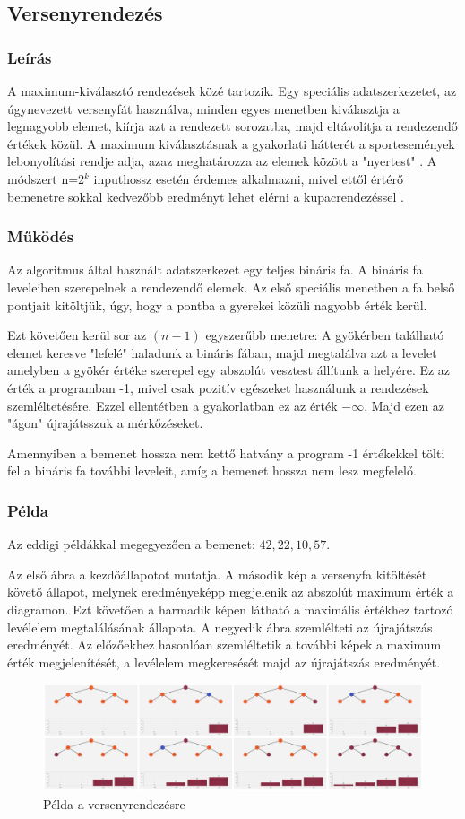 \documentclass{elteikthesis}
\newcommand{\hiddensubsubsection}[1]{
	\stepcounter{subsubsection}
	\subsubsection*{{#1}}	
}
\begin{document}
\subsection{Versenyrendezés}
\hiddensubsubsection{Leírás}
A maximum-kiválasztó rendezések közé tartozik. Egy speciális adatszerkezetet, az úgynevezett versenyfát használva, minden egyes menetben kiválasztja a legnagyobb elemet, kiírja azt a rendezett sorozatba, majd eltávolítja a rendezendő értékek közül. A maximum kiválasztásnak a gyakorlati hátterét a sportesemények lebonyolítási rendje adja, azaz meghatározza az elemek között a "nyertest" \cite{Fekete}. A módszert n=2$^k$ inputhossz esetén érdemes alkalmazni, mivel ettől értérő bemenetre sokkal kedvezőbb eredményt lehet elérni a kupacrendezéssel \cite{Fekete}. \par
\hiddensubsubsection{Működés}
Az algoritmus által használt adatszerkezet egy teljes bináris fa. A bináris fa leveleiben szerepelnek a rendezendő elemek. Az első speciális menetben a fa belső pontjait kitöltjük, úgy, hogy a pontba a gyerekei közüli nagyobb érték kerül.\par 
Ezt követően kerül sor az $(n-1)$ egyszerűbb menetre: A gyökérben található elemet keresve "lefelé" haladunk a bináris fában, majd megtalálva azt a levelet amelyben a gyökér értéke szerepel egy abszolút vesztest állítunk a helyére. Ez az érték a programban -1, mivel csak pozitív egészeket használunk a rendezések szemléltetésére. Ezzel ellentétben a gyakorlatban ez az érték $-\infty$. Majd ezen az "ágon" újrajátsszuk a mérkőzéseket.\par
Amennyiben a bemenet hossza nem kettő hatvány a program -1 értékekkel tölti fel a bináris fa további leveleit, amíg a bemenet hossza nem lesz megfelelő.
 \hiddensubsubsection{Példa}
 Az eddigi példákkal megegyezően a bemenet: $42, 22, 10, 57$.\par
 Az első ábra a kezdőállapotot mutatja. A második kép a versenyfa kitöltését követő állapot, melynek eredményeképp megjelenik az abszolút maximum érték a diagramon. Ezt követően a harmadik képen látható a maximális értékhez tartozó levélelem megtalálásának állapota. A negyedik ábra szemlélteti az újrajátszás eredményét. Az előzőekhez hasonlóan szemléltetik a további képek a maximum érték megjelenítését, a levélelem megkeresését majd az újrajátszás eredményét.\par
 \begin{figure}[H]
 	\centering
 	\includegraphics[width=\textwidth]{pics/tournament.jpg}
 	\caption{Példa a versenyrendezésre}
 \end{figure}
\end{document}
